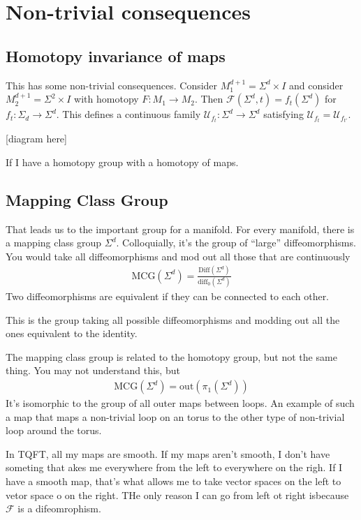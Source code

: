 \section{Non-trivial consequences}
\subsection{Homotopy invariance of maps}
This has some non-trivial consequences.
Consider $M_1^{d+1}=\Sigma^d\times I$
and consider $M_2^{d+1}=\Sigma^2\times I$
with homotopy
$F: M_1\to M_2$.
Then
$\mathcal{F}(\Sigma^d, t)
= f_t(\Sigma^d)$
for $f_t: \Sigma_d\to \Sigma^d$.
This defines a continuous family
$\mathcal{U}_{f_t}: \Sigma^d\to \Sigma^d$ satisfying
$\mathcal{U}_{f_t} = \mathcal{U}_{f_{t'}}$.

[diagram here]

If I have a homotopy group with a homotopy of maps.

\subsection{Mapping Class Group}
That leads us to the important group for a manifold.
For every manifold, there is a mapping class group $\Sigma^d$.
Colloquially, it's the group of ``large'' diffeomorphisms.
You would take all diffeomorphisms and mod out all those that are continuously
\begin{align}
    \mathrm{MCG}(\Sigma^d) = \frac{\mathrm{Diff}(\Sigma^d)}{\mathrm{diff}_0(\Sigma^d)}
\end{align}
Two diffeomorphisms are equivalent if they can be connected to each other.

This is the group taking all possible diffeomorphisms
and modding out all the ones equivalent to the identity.

The mapping class group is related to the homotopy group,
but not the same thing.
You may not understand this,
but
\begin{align}
    \mathrm{MCG}(\Sigma^d)
    = \mathrm{out}(\pi_1(\Sigma^d))
\end{align}
It's isomorphic to the group of all outer maps between loops.
An example of such a map that maps a non-trivial loop on an torus
to the other type of non-trivial loop around the torus.

In TQFT,
all my maps are smooth.
If my maps aren't smooth,
I don't have someting that akes me everywhere from the left to everywhere on the
righ.
If I have a smooth map,
that's what allows me to take vector spaces on the left to vetor space o on the
right.
THe only reason I can go from left ot right isbecause $\mathcal{F}$ is a
difeomrophism.

